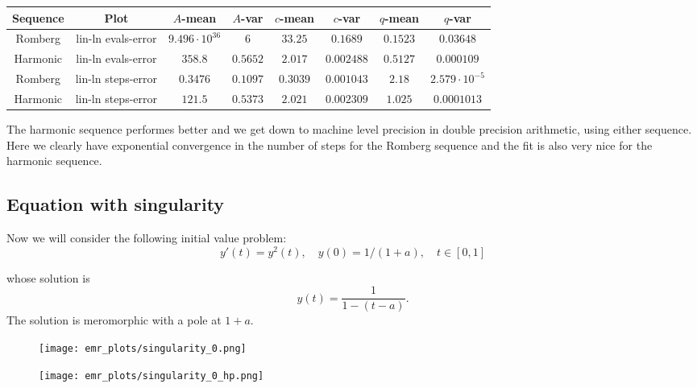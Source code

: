 \begin{table}[H]
    \centering
    \small
     \begin{tabular}{c|c||c|c|c|c|c|c}
Sequence & Plot & \(A\)-mean & \(A\)-var & \(c\)-mean & \(c\)-var & \(q\)-mean & \(q\)-var\\\hline
Romberg & lin-ln evals-error & \(9.496\cdot 10^{36}\) & \(6\) & \(33.25\) & \(0.1689\) & \(0.1523\) & \(0.03648\) \\
Harmonic & lin-ln evals-error & \(358.8\) & \(0.5652\) & \(2.017\) & \(0.002488\) & \(0.5127\) & \(0.000109\) \\
Romberg & lin-ln steps-error & \(0.3476\) & \(0.1097\) & \(0.3039\) & \(0.001043\) & \(2.18\) & \(2.579\cdot 10^{-5}\) \\
Harmonic & lin-ln steps-error & \(121.5\) & \(0.5373\) & \(2.021\) & \(0.002309\) & \(1.025\) & \(0.0001013\) \\
    \end{tabular}
    \label{tab:my_label}
\end{table}

The harmonic sequence performes better and we get down to machine level precision in double precision arithmetic, using either sequence.\\

Here we clearly have exponential convergence in the number of steps for the Romberg sequence and the fit is also very nice for the harmonic sequence.

\subsection{Equation with singularity}

Now we will consider the following initial value problem:
\begin{equation}\label{46}
y'(t) = y^2(t),\quad y(0) = 1/(1+a), \quad t\in [0,1]
\end{equation}

whose solution is 
\[
y(t) = \frac{1}{1-(t-a)}.
\]
The solution is meromorphic with a pole at \(1+a\).

\begin{figure}[H]
\centering
\begin{minipage}{0.45\textwidth}
\centering
\texttt{[image: emr\_plots/singularity\_0.png]}
\end{minipage}
\begin{minipage}{0.45\textwidth}
\centering
\texttt{[image: emr\_plots/singularity\_0\_hp.png]}
\end{minipage}
\end{figure}

